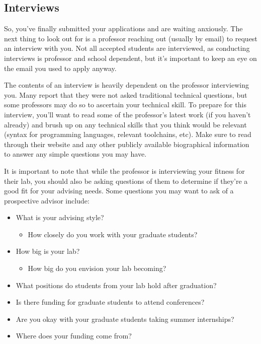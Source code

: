 \documentclass[12pt]{article}
\begin{document}
\subsection{Interviews}

So, you've finally submitted your applications and are waiting anxiously. The next thing to look out for is a professor reaching out (usually by email) to request an interview with you. Not all accepted students are interviewed, as conducting interviews is professor and school dependent, but it's important to keep an eye on the email you used to apply anyway.

The contents of an interview is heavily dependent on the professor interviewing you. Many report that they were not asked traditional technical questions, but some professors may do so to ascertain your technical skill. To prepare for this interview, you'll want to read some of the professor's latest work (if you haven't already) and brush up on any technical skills that you think would be relevant (syntax for programming languages, relevant toolchains, etc). Make sure to read through their website and any other publicly available biographical information to answer any simple questions you may have.

It is important to note that while the professor is interviewing your fitness for their lab, you should also be asking questions of them to determine if they're a good fit for your advising needs. Some questions you may want to ask of a prospective advisor include:

\begin{itemize}
    \item What is your advising style?
    \begin{itemize}
        \item How closely do you work with your graduate students?
    \end{itemize}
    \item How big is your lab?
    \begin{itemize}
        \item How big do you envision your lab becoming?
    \end{itemize}
    \item What positions do students from your lab hold after graduation?
    \item Is there funding for graduate students to attend conferences?
    \item Are you okay with your graduate students taking summer internships?
    \item Where does your funding come from?
\end{itemize}
\end{document}
